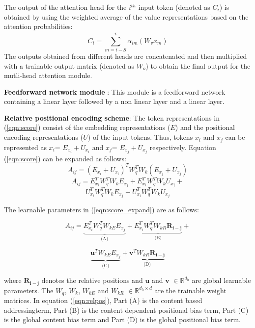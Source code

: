 \documentclass[11pt]{article}
\begin{document}
The output of the attention head for the $i^{th}$ input token (denoted as $C_i$) is obtained by using the weighted average of the value representations based on the attention probabilities:
\begin{equation}
\label{eqn:attn_output}
    C_{i} = \sum_{m= i-S}^{i} \alpha_{im}(W_v x_{m})
\end{equation}
The outputs obtained from different heads are concatenated and then multiplied with a trainable output matrix (denoted as $W_o$)  to obtain the final output for the mutli-head attention module.

\textbf{Feedforward network module} :  This module is a feedforward network containing a linear layer followed by a non linear layer and a linear layer.

\textbf{Relative positional encoding scheme}: The token representations in (\ref{eqn:score}) consist of the embedding representations ($E$) and the positional encoding representations ($U$) of the input tokens. Thus, tokens $x_i$ and $x_j$ can be represented as $x_i$= $E_{x_i} + U_{x_i}$ and $x_j$= $E_{x_j} + U_{x_j}$ respectively. Equation (\ref{eqn:score}) can be expanded as follows:
\[
     A_{ij}  =  (E_{x_i} + U_{x_i})^{T} W_q^{T} W_k (E_{x_j} + U_{x_j})
\]
\[
     A_{ij}  =  E_{x_i}^{T} W_q^{T} W_k E_{x_j} + E_{x_i}^{T} W_q^{T} W_k U_{x_j} + 
\]
\begin{equation}
\label{eqn:score_expand}
 U_{x_i}^{T}  W_q^{T}  W_k E_{x_j} +
 U_{x_i}^{T}  W_q^{T}  W_k U_{x_j}    
\end{equation}

The learnable parameters in (\ref{eqn:score_expand}) are as follows:

\[
     A_{ij}  = \underbrace{ E_{x_i}^{T} W_q^{T} W_{k E} E_{x_j} }_\text{(A)} + \underbrace{E_{x_i}^{T} W_q^{T} W_{k R} \mathbf{R_{i-j}} }_\text{(B)} + 
\]

\begin{equation}
\label{eqn:relpos}
\underbrace{ \mathbf{u}^{T}  W_{k E} E_{x_j} }_\text{(C)} + \underbrace{ \mathbf{v}^{T} W_{k R}\mathbf{R_{i-j}} }_\text{(D)}
\end{equation}


where $\mathbf{R_{i-j}}$ denotes the relative positions and $\mathbf{u}$ and $\mathbf{v}$  $ \in \mathbb{R}^{d_h}$ are global learnable parameters. The $W_q$, $W_k$, $W_{kE}$ and $W_{kR}$ $\in \mathbb{R}^{d_h \times d}$ are the trainable weight matrices. In equation (\ref{eqn:relpos}), Part (A) is the content based addressingterm, Part (B) is the content dependent positional bias term, Part (C) is the global content bias term and Part (D) is the global positional bias term. 
\end{document}
